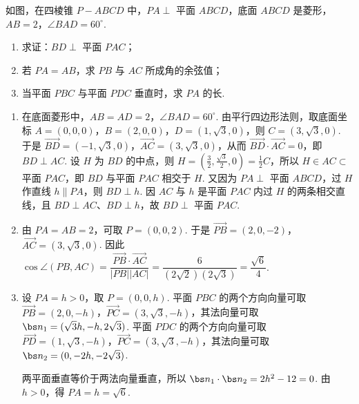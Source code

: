 \begin{problem}
如图，在四棱锥 \(P - ABCD\) 中，\(PA \perp\) 平面 \(ABCD\)，底面 \(ABCD\) 是菱形，\(AB = 2\)，\(\angle BAD = 60^{\circ}\).

\begin{enumerate}
\item 求证：\(BD \perp\) 平面 \(PAC\)；
\item 若 \(PA = AB\)，求 \(PB\) 与 \(AC\) 所成角的余弦值；
\item 当平面 \(PBC\) 与平面 \(PDC\) 垂直时，求 \(PA\) 的长.
\end{enumerate}


\begin{solution}
\begin{enumerate}
\item 在底面菱形中，\(AB=AD=2\)，\(\angle BAD=60^{\circ}\). 由平行四边形法则，取底面坐标
\(A=(0,0,0)\)，\(B=(2,0,0)\)，\(D=(1,\sqrt3,0)\)，则 \(C=(3,\sqrt3,0)\). 于是
\(\overrightarrow{BD}=(-1,\sqrt3,0)\)，\(\overrightarrow{AC}=(3,\sqrt3,0)\)，从而 \(\overrightarrow{BD}\cdot\overrightarrow{AC}=0\)，即 \(BD\perp AC\). 设 \(H\) 为 \(BD\) 的中点，则 \(H=(\frac32,\frac{\sqrt3}{2},0)=\frac12C\)，所以 \(H\in AC\subset\) 平面 \(PAC\)，即 \(BD\) 与平面 \(PAC\) 相交于 \(H\). 又因为 \(PA\perp\) 平面 \(ABCD\)，过 \(H\) 作直线 \(h\parallel PA\)，则 \(BD\perp h\). 因 \(AC\) 与 \(h\) 是平面 \(PAC\) 内过 \(H\) 的两条相交直线，且 \(BD\perp AC\)、\(BD\perp h\)，故 \(BD\perp\) 平面 \(PAC\).
\item 由 \(PA=AB=2\)，可取 \(P=(0,0,2)\). 于是 \(\overrightarrow{PB}=(2,0,-2)\)，\(\overrightarrow{AC}=(3,\sqrt3,0)\). 因此
\(\cos\angle(PB,AC)=\dfrac{\overrightarrow{PB}\cdot\overrightarrow{AC}}{|PB||AC|}=\dfrac6{(2\sqrt2)(2\sqrt3)}=\dfrac{\sqrt6}{4}\).
\item 设 \(PA=h>0\)，取 \(P=(0,0,h)\). 平面 \(PBC\) 的两个方向向量可取 \(\overrightarrow{PB}=(2,0,-h)\)，\(\overrightarrow{PC}=(3,\sqrt3,-h)\)，其法向量可取
\(\bs n_1=(\sqrt3h,-h,2\sqrt3)\). 平面 \(PDC\) 的两个方向向量可取 \(\overrightarrow{PD}=(1,\sqrt3,-h)\)，\(\overrightarrow{PC}=(3,\sqrt3,-h)\)，其法向量可取 \(\bs n_2=(0,-2h,-2\sqrt3)\).

两平面垂直等价于两法向量垂直，所以 \(\bs n_1\cdot\bs n_2=2h^2-12=0\). 由 \(h>0\)，得 \(PA=h=\sqrt6\).
\end{enumerate}
\end{solution}
\end{problem}

